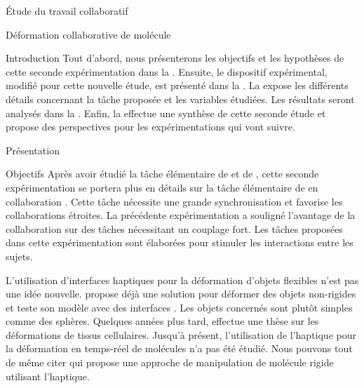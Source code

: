 \documentclass[myfrancais]{mythesis}
\begin{document}
\begin{mypart}{Étude du travail collaboratif}
\begin{mychapter}{Déformation collaborative de molécule}
\begin{mysection}{Introduction}
				Tout d'abord, nous présenterons les objectifs et les hypothèses de cette seconde expérimentation dans la .
				Ensuite, le dispositif expérimental, modifié pour cette nouvelle étude, est présenté dans la .
				La  expose les différents détails concernant la tâche proposée et les variables étudiées.
				Les résultats seront analysés dans la .
				Enfin, la  effectue une synthèse de cette seconde étude et propose des perspectives pour les expérimentations qui vont suivre.
			\end{mysection}
			\begin{mysection}{Présentation}
				\begin{mysubsection}{Objectifs}
					Après avoir étudié la tâche élémentaire de  et de , cette seconde expérimentation se portera plus en détails sur la tâche élémentaire de  en collaboration .
					Cette tâche nécessite une grande synchronisation et favorise les collaborations étroites.
					La précédente expérimentation  a souligné l'avantage de la collaboration sur des tâches nécessitant un couplage fort.
					Les tâches proposées dans cette expérimentation sont élaborées pour stimuler les interactions entre les sujets.

					L'utilisation d'interfaces haptiques pour la déformation d'objets flexibles n'est pas une idée nouvelle.
					 propose déjà une solution pour déformer des objets non-rigides et teste son modèle avec des interfaces \myOmni.
					Les objets concernés sont plutôt simples comme des sphères.
					Quelques années plus tard,  effectue une thèse sur les déformations de tissus cellulaires.
					Jusqu'à présent, l'utilisation de l'haptique pour la déformation en temps-réel de molécules n'a pas été étudié.
					Nous pouvons tout de même citer  qui propose une approche de manipulation de molécule rigide utilisant l'haptique.


\end{mysubsection}
\end{mysection}
\end{mychapter}
\end{mypart}
\end{document}
